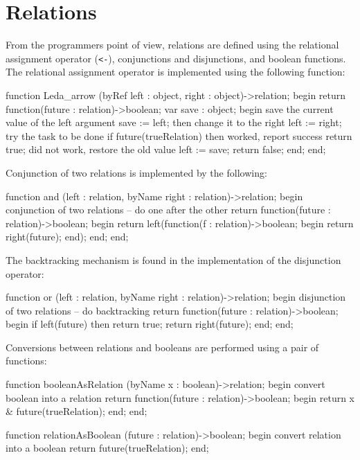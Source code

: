 \section{Relations}

From the programmers point of view, relations are defined using
the relational assignment operator (\verb+<-+), conjunctions and
disjunctions, and boolean functions.  The relational assignment
operator is implemented using the following function:

\begin{cprog}

function Leda_arrow (byRef left : object, right : object)->relation;
begin
	return function(future : relation)->boolean;
		var
			save : object;
	begin
			{ save the current value of the left argument }
		save := left;
			{ then change it to the right }
		left := right;
			{ try the task to be done }
		if future(trueRelation) then
				{ worked, report success }
			return true;
			{ did not work, restore the old value }
		left := save;
		return false;
	end;
end;

\end{cprog}

Conjunction of two relations is implemented by the following:

\begin{cprog}

function and (left : relation, byName right : relation)->relation;
begin
		{ conjunction of two relations -- do one after the other }
	return function(future : relation)->boolean;
		begin
			return left(function(f : relation)->boolean;
				begin
					return right(future);
				end);
		end;
end;

\end{cprog}

The backtracking mechanism is found in the implementation of
the disjunction operator:

\begin{cprog}

function or (left : relation, byName right : relation)->relation;
begin
		{ disjunction of two relations -- do backtracking }
	return function(future : relation)->boolean;
		begin
			if left(future) then return true;
			return right(future);
		end;
end;

\end{cprog}

Conversions between relations and booleans are performed using
a pair of functions:

\begin{cprog}

function booleanAsRelation (byName x : boolean)->relation;
begin
		{ convert boolean into a relation }
	return function(future : relation)->boolean;
		begin
			return x & future(trueRelation);
		end;
end;

function relationAsBoolean (future : relation)->boolean;
begin
		{ convert relation into a boolean }
	return future(trueRelation);
end;

\end{cprog}

